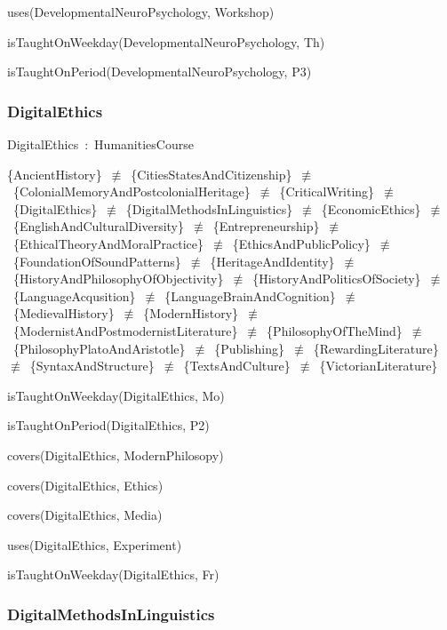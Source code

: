 \documentclass{article}
\begin{document}
uses(DevelopmentalNeuroPsychology, Workshop)

isTaughtOnWeekday(DevelopmentalNeuroPsychology, Th)

isTaughtOnPeriod(DevelopmentalNeuroPsychology, P3)

\subsubsection*{DigitalEthics}

DigitalEthics~:~HumanitiesCourse

\{AncientHistory\}~\ensuremath{\not\equiv}~\{CitiesStatesAndCitizenship\}~\ensuremath{\not\equiv}~\{ColonialMemoryAndPostcolonialHeritage\}~\ensuremath{\not\equiv}~\{CriticalWriting\}~\ensuremath{\not\equiv}~\{DigitalEthics\}~\ensuremath{\not\equiv}~\{DigitalMethodsInLinguistics\}~\ensuremath{\not\equiv}~\{EconomicEthics\}~\ensuremath{\not\equiv}~\{EnglishAndCulturalDiversity\}~\ensuremath{\not\equiv}~\{Entrepreneurship\}~\ensuremath{\not\equiv}~\{EthicalTheoryAndMoralPractice\}~\ensuremath{\not\equiv}~\{EthicsAndPublicPolicy\}~\ensuremath{\not\equiv}~\{FoundationOfSoundPatterns\}~\ensuremath{\not\equiv}~\{HeritageAndIdentity\}~\ensuremath{\not\equiv}~\{HistoryAndPhilosophyOfObjectivity\}~\ensuremath{\not\equiv}~\{HistoryAndPoliticsOfSociety\}~\ensuremath{\not\equiv}~\{LanguageAcqusition\}~\ensuremath{\not\equiv}~\{LanguageBrainAndCognition\}~\ensuremath{\not\equiv}~\{MedievalHistory\}~\ensuremath{\not\equiv}~\{ModernHistory\}~\ensuremath{\not\equiv}~\{ModernistAndPostmodernistLiterature\}~\ensuremath{\not\equiv}~\{PhilosophyOfTheMind\}~\ensuremath{\not\equiv}~\{PhilosophyPlatoAndAristotle\}~\ensuremath{\not\equiv}~\{Publishing\}~\ensuremath{\not\equiv}~\{RewardingLiterature\}~\ensuremath{\not\equiv}~\{SyntaxAndStructure\}~\ensuremath{\not\equiv}~\{TextsAndCulture\}~\ensuremath{\not\equiv}~\{VictorianLiterature\}

isTaughtOnWeekday(DigitalEthics, Mo)

isTaughtOnPeriod(DigitalEthics, P2)

covers(DigitalEthics, ModernPhilosopy)

covers(DigitalEthics, Ethics)

covers(DigitalEthics, Media)

uses(DigitalEthics, Experiment)

isTaughtOnWeekday(DigitalEthics, Fr)

\subsubsection*{DigitalMethodsInLinguistics}
\end{document}
